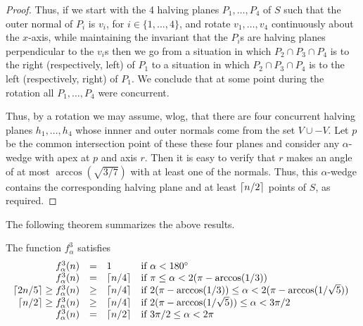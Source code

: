 \documentclass{dmtcs}
\begin{document}
{\begin{proof}
Thus, if we start with the 4 halving planes $P_1,\ldots,P_4$ of $S$
such that the outer normal of $P_i$ is $v_i$, for
$i\in\{1,\ldots,4\}$, and rotate $v_1,\ldots,v_4$ continuously about the
$x$-axis, while maintaining the invariant that the $P_i$s are halving
planes perpendicular to the $v_i$s then we go from a situation in
which $P_2\cap P_3\cap P_4$ is to the right (respectively, left) of
$P_1$ to a situation in which $P_2\cap P_3\cap P_4$ is to the left
(respectively, right) of $P_1$.  We conclude that at some point during
the rotation all $P_1,\ldots,P_4$ were concurrent.

Thus, by a rotation we may assume, wlog, that there are four
concurrent halving planes $h_1,\ldots,h_4$ whose innner and outer
normals come from the set $V\cup -V$.  Let $p$ be the common
intersection point of these these four planes and consider any
$\alpha$-wedge with apex at $p$ and axis $r$.  Then it is easy to
verify that $r$ makes an angle of at most $\arccos(\sqrt{3/7})$ with
at least one of the normals.  Thus, this $\alpha$-wedge contains the
corresponding halving plane and at least $\left\lceil n/2 \right\rceil$ points of $S$,
as required.
\end{proof}
}


The following theorem summarizes the above results.

\begin{thm}
The function $f_\alpha^3$ satisfies
\[\begin{array}{rcll}
  f^3_\alpha(n) & = & 1 & \mbox{if $\alpha < 180^\circ$} \\
  f^3_\alpha(n) & = & \left\lceil n/4 \right\rceil & 
    \mbox{if $\pi \le \alpha < 2(\pi-\arccos(1/3))$ 
         } \\
\left\lceil 2n/5 \right\rceil\ge  f^3_\alpha(n) & \ge & \left\lceil n/4 \right\rceil & 
    \mbox{if $2(\pi-\arccos(1/3))\le\alpha < 2(\pi-\arccos(1/\sqrt{5}))$ 
         } \\
\left\lceil n/2 \right\rceil\ge  f^3_\alpha(n) & \ge & \left\lceil n/4 \right\rceil & 
    \mbox{if $2(\pi-\arccos(1/\sqrt{5})) \le \alpha < 3\pi/2$
         } \\
  f^3_\alpha(n) & = & \left\lceil n/2 \right\rceil & 
    \mbox{if $3\pi/2 \le \alpha < 2\pi$ 
         } \\
\end{array}\]
\end{thm}
\end{document}
